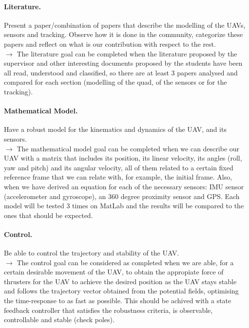 \documentclass{article}
\begin{document}
		\paragraph{Literature.} Present a paper/combination of papers that describe the modelling of the UAVs, sensors and tracking. Observe how it is done in the community, categorize these papers and reflect on what is our contribution with respect to the rest.\\  
		$\rightarrow$ The literature goal can be completed when the literature proposed by the supervisor and other interesting documents proposed by the students have been all read, understood and classified, so there are at least 3 papers analysed and compared for each section (modelling of the quad, of the sensors or for the tracking).
	
		\paragraph{Mathematical Model.} Have a robust model for the kinematics and dynamics of the UAV, and its sensors.\\
		$\rightarrow$ The mathematical model goal can be completed when we can describe our UAV with a matrix that includes its position, its linear velocity, its angles (roll, yaw and pitch) and its angular velocity, all of them related to a certain fixed reference frame that we can relate with, for example, the initial frame. Also, when we have derived an equation for each of the necessary sensors: IMU sensor (accelerometer and gyroscope), an 360 degree proximity sensor and GPS. Each model will be tested 3 times on MatLab and the results will be compared to the ones that should be expected.
		
		\paragraph{Control.} Be able to control the trajectory and stability of the UAV. \\
		$\rightarrow$ The control goal can be considered as completed when we are able, for a certain desirable movement of the UAV, to obtain the appropiate force of thrusters for the UAV to achieve the desired position as the UAV stays stable and follows the trajectory vector obtained from the potential fields, optimising the time-response to as fast as possible. This should be achived with a state feedback controller that satisfies the robustness criteria, is observable, controllable and stable (check poles). %
		
\end{document}
